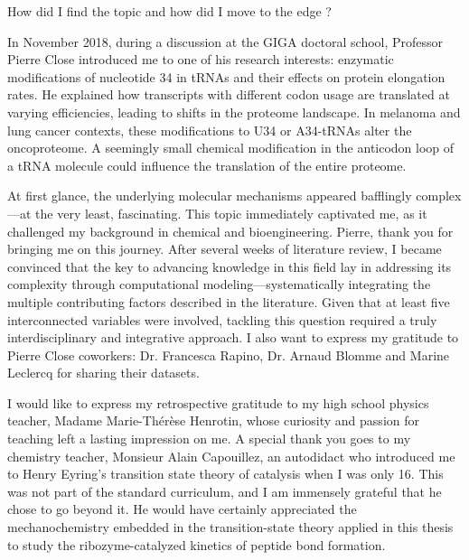 How did I find the topic and how did I move to the edge ?

In November 2018, during a discussion at the GIGA doctoral school, Professor Pierre Close introduced me to one of his research interests: enzymatic modifications of nucleotide 34 in tRNAs and their effects on protein elongation rates. He explained how transcripts with different codon usage are translated at varying efficiencies, leading to shifts in the proteome landscape. In melanoma and lung cancer contexts, these modifications to U34 or A34-tRNAs alter the oncoproteome. A seemingly small chemical modification in the anticodon loop of a tRNA molecule could influence the translation of the entire proteome.

At first glance, the underlying molecular mechanisms appeared bafflingly complex—at the very least, fascinating. This topic immediately captivated me, as it challenged my background in chemical and bioengineering. Pierre, thank you for bringing me on this journey. After several weeks of literature review, I became convinced that the key to advancing knowledge in this field lay in addressing its complexity through computational modeling—systematically integrating the multiple contributing factors described in the literature. Given that at least five interconnected variables were involved, tackling this question required a truly interdisciplinary and integrative approach. I also want to express my gratitude to Pierre Close coworkers: Dr. Francesca Rapino, Dr. Arnaud Blomme and Marine Leclercq for sharing their datasets.

I would like to express my retrospective gratitude to my high school physics teacher, Madame Marie-Thérèse Henrotin, whose curiosity and passion for teaching left a lasting impression on me. A special thank you goes to my chemistry teacher, Monsieur Alain Capouillez, an autodidact who introduced me to Henry Eyring’s transition state theory of catalysis when I was only 16. This was not part of the standard curriculum, and I am immensely grateful that he chose to go beyond it. He would have certainly appreciated the mechanochemistry embedded in the transition-state theory applied in this thesis to study the ribozyme-catalyzed kinetics of peptide bond formation.

